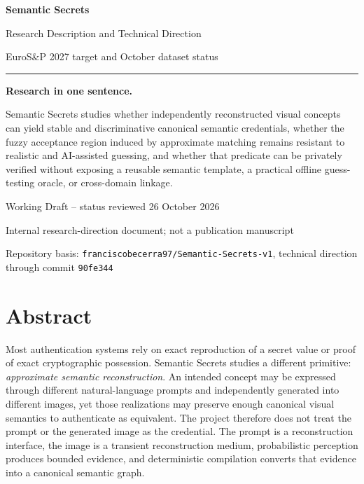 \documentclass[11pt,a4paper]{article}
\newcommand{\code}[1]{\texttt{#1}}
\begin{document}
\hypersetup{pageanchor=false}
\begin{titlepage}
\centering
\vspace*{2.0cm}
{\Huge\bfseries\color{SSBlue} Semantic Secrets\par}
\vspace{0.4cm}
{\LARGE Research Description and Technical Direction\par}
  \vspace{0.25cm}
  {\large EuroS\&P 2027 target and October dataset status\par}
\vspace{1.0cm}
\rule{0.82\textwidth}{0.7pt}
\vspace{1.0cm}

\begin{minipage}{0.84\textwidth}
\begin{keybox}
\centering
\textbf{Research in one sentence.}\par\medskip
Semantic Secrets studies whether independently reconstructed visual concepts can yield stable and discriminative canonical semantic credentials, whether the fuzzy acceptance region induced by approximate matching remains resistant to realistic and AI-assisted guessing, and whether that predicate can be privately verified without exposing a reusable semantic template, a practical offline guess-testing oracle, or cross-domain linkage.
\end{keybox}
\end{minipage}

\vfill
  {\large Working Draft -- status reviewed 26 October 2026\par}
\vspace{0.2cm}
{\small Internal research-direction document; not a publication manuscript\par}
\vspace{0.3cm}
  {\small Repository basis: \code{franciscobecerra97/Semantic-Secrets-v1}, technical direction through commit \code{90fe344}\par}
\end{titlepage}
\hypersetup{pageanchor=true}

\setcounter{tocdepth}{1}
\tableofcontents
\newpage

\section{Abstract}

Most authentication systems rely on exact reproduction of a secret value or proof of exact cryptographic possession. Semantic Secrets studies a different primitive: \emph{approximate semantic reconstruction}. An intended concept may be expressed through different natural-language prompts and independently generated into different images, yet those realizations may preserve enough canonical visual semantics to authenticate as equivalent. The project therefore does not treat the prompt or the generated image as the credential. The prompt is a reconstruction interface, the image is a transient reconstruction medium, probabilistic perception produces bounded evidence, and deterministic compilation converts that evidence into a canonical semantic graph.
\end{document}
